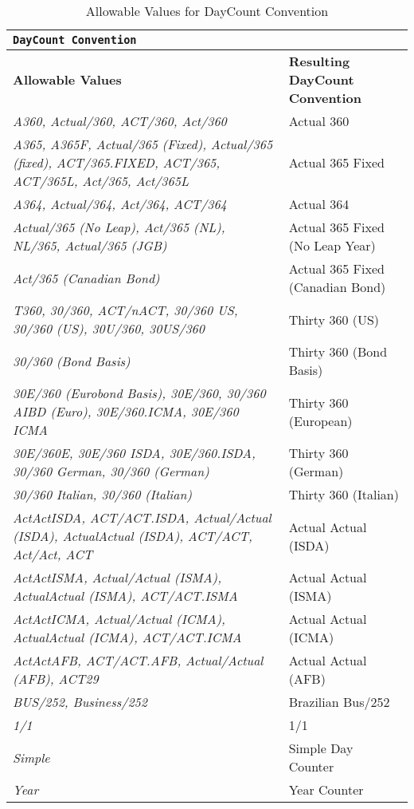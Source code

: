 \begin{table}[H]
\centering
  \begin{tabular} {|p{6cm}|p{6cm}|}
    \hline
    \multicolumn{2}{|l|}{\tt DayCount Convention}                          \\ \hline
    \bfseries{Allowable Values} & \bfseries{Resulting DayCount Convention} \\
    \hline
    \emph{A360, Actual/360, ACT/360, Act/360}& Actual 360  \\ \hline
    \emph{A365, A365F, Actual/365 (Fixed), Actual/365 (fixed), ACT/365.FIXED, ACT/365, ACT/365L, Act/365, Act/365L} & Actual 365 Fixed \\ \hline
    \emph{A364, Actual/364, Act/364, ACT/364}& Actual 364  \\ \hline
    \emph{Actual/365 (No Leap), Act/365 (NL), NL/365, Actual/365 (JGB)} & Actual 365 Fixed (No Leap Year)\\ \hline
    \emph{Act/365 (Canadian Bond)} & Actual 365 Fixed (Canadian Bond)\\ \hline
    \emph{T360, 30/360, ACT/nACT, 30/360 US, 30/360 (US), 30U/360, 30US/360} & Thirty 360 (US) \\ \hline
    \emph{30/360 (Bond Basis)} & Thirty 360 (Bond Basis) \\ \hline
    \emph{30E/360 (Eurobond Basis), 30E/360, 30/360 AIBD (Euro), 30E/360.ICMA, 30E/360 ICMA} & Thirty 360 (European) \\ \hline
    \emph{30E/360E, 30E/360 ISDA, 30E/360.ISDA, 30/360 German, 30/360 (German)} & Thirty 360 (German) \\ \hline
    \emph{30/360 Italian, 30/360 (Italian)} & Thirty 360 (Italian) \\ \hline
    \emph{ActActISDA, ACT/ACT.ISDA, Actual/Actual (ISDA), ActualActual (ISDA), ACT/ACT, Act/Act, ACT} & Actual Actual (ISDA) \\ \hline
    \emph{ActActISMA, Actual/Actual (ISMA), ActualActual (ISMA), ACT/ACT.ISMA} & Actual Actual (ISMA) \\ \hline
    \emph{ActActICMA, Actual/Actual (ICMA), ActualActual (ICMA), ACT/ACT.ICMA} & Actual Actual (ICMA) \\ \hline
    \emph{ActActAFB, ACT/ACT.AFB, Actual/Actual (AFB), ACT29} & Actual Actual (AFB) \\ \hline
    \emph{BUS/252, Business/252} & Brazilian Bus/252 \\ \hline
    \emph{1/1} & 1/1  \\ \hline
    \emph{Simple} & Simple Day Counter  \\ \hline
    \emph{Year} & Year Counter  \\ \hline
  \end{tabular}
  \caption{Allowable Values for DayCount Convention}
  \label{tab:daycount}
\end{table}

